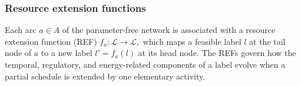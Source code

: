 \documentclass[3p,11pt,authoryear]{elsarticle}  %
\begin{document}

\subsubsection{Resource extension functions}

Each arc \(a\in A\) of the parameter-free network is associated with a resource extension function (REF)
\(
f_a:\mathcal{L}\rightarrow\mathcal{L},
\)
which maps a feasible label \(l\) at the tail node of \(a\) to a new label \(l'=f_a(l)\) at its head node. The REFs govern how the temporal, regulatory, and energy-related components of a label evolve when a partial schedule is extended by one elementary activity.
\end{document}

